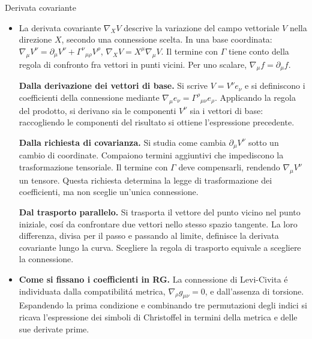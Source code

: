 \begin{frame}[t]{Derivata covariante}\small\raggedright
    \begin{itemize}
\item La derivata covariante $\nabla_X V$ descrive la variazione del campo vettoriale $V$ nella direzione $X$, secondo una connessione scelta. In una base coordinata: $\nabla_\mu V^\nu=\partial_\mu V^\nu+\Gamma^\nu{}_{\mu\rho}V^\rho$, $\nabla_XV=X^\mu\nabla_\mu V$. Il termine con $\Gamma$ tiene conto della regola di confronto fra vettori in punti vicini. Per uno scalare, $\nabla_\mu f=\partial_\mu f$.

\textbf{Dalla derivazione dei vettori di base.} Si scrive $V=V^\nu e_\nu$ e si definiscono i coefficienti della connessione mediante $\nabla_\mu e_\nu=\Gamma^\rho{}_{\mu\nu}e_\rho$. Applicando la regola del prodotto, si derivano sia le componenti $V^\nu$ sia i vettori di base: raccogliendo le componenti del risultato si ottiene l'espressione precedente.

\textbf{Dalla richiesta di covarianza.} Si studia come cambia $\partial_\mu V^\nu$ sotto un cambio di coordinate. Compaiono termini aggiuntivi che impediscono la trasformazione tensoriale. Il termine con $\Gamma$ deve compensarli, rendendo $\nabla_\mu V^\nu$ un tensore. Questa richiesta determina la legge di trasformazione dei coefficienti, ma non sceglie un'unica connessione.

\textbf{Dal trasporto parallelo.} Si trasporta il vettore del punto vicino nel punto iniziale, cos\'i da confrontare due vettori nello stesso spazio tangente. La loro differenza, divisa per il passo e passando al limite, definisce la derivata covariante lungo la curva. Scegliere la regola di trasporto equivale a scegliere la connessione.

\item \textbf{Come si fissano i coefficienti in RG.} La connessione di Levi-Civita \'e individuata dalla compatibilit\'a metrica, $\nabla_\rho g_{\mu\nu}=0$, e dall'assenza di torsione. Espandendo la prima condizione e combinando tre permutazioni degli indici si ricava l'espressione dei simboli di Christoffel in termini della metrica e delle sue derivate prime.
\end{itemize}
\end{frame}

